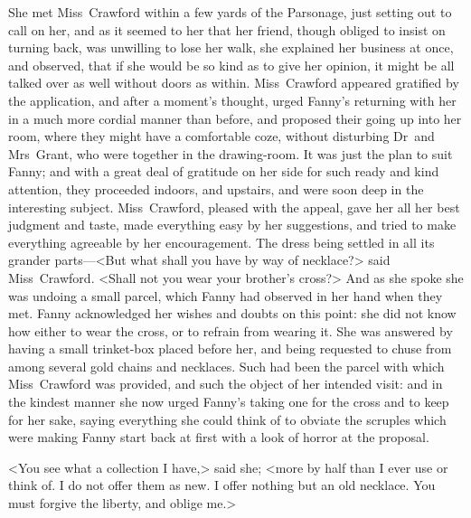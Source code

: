 She met Miss~Crawford within a few yards of the Parsonage, just setting out to call on her, and as it seemed to her that her friend, though obliged to insist on turning back, was unwilling to lose her walk, she explained her business at once, and observed, that if she would be so kind as to give her opinion, it might be all talked over as well without doors as within. Miss~Crawford appeared gratified by the application, and after a moment's thought, urged Fanny's returning with her in a much more cordial manner than before, and proposed their going up into her room, where they might have a comfortable coze, without disturbing Dr~and Mrs~Grant, who were together in the drawing-room. It was just the plan to suit Fanny; and with a great deal of gratitude on her side for such ready and kind attention, they proceeded indoors, and upstairs, and were soon deep in the interesting subject. Miss~Crawford, pleased with the appeal, gave her all her best judgment and taste, made everything easy by her suggestions, and tried to make everything agreeable by her encouragement. The dress being settled in all its grander parts—<But what shall you have by way of necklace?> said Miss~Crawford. <Shall not you wear your brother's cross?> And as she spoke she was undoing a small parcel, which Fanny had observed in her hand when they met. Fanny acknowledged her wishes and doubts on this point: she did not know how either to wear the cross, or to refrain from wearing it. She was answered by having a small trinket-box placed before her, and being requested to chuse from among several gold chains and necklaces. Such had been the parcel with which Miss~Crawford was provided, and such the object of her intended visit: and in the kindest manner she now urged Fanny's taking one for the cross and to keep for her sake, saying everything she could think of to obviate the scruples which were making Fanny start back at first with a look of horror at the proposal.

<You see what a collection I have,> said she; <more by half than I ever use or think of. I do not offer them as new. I offer nothing but an old necklace. You must forgive the liberty, and oblige me.>

